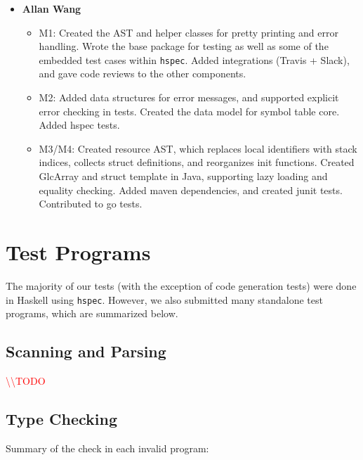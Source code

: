 \documentclass[11pt]{article}
\newcommand{\todo}[0]{\textcolor{red}{\textbackslash\textbackslash TODO \ }}
\begin{document}
\begin{itemize}
	\item \textbf{Allan Wang}
	\begin{itemize}
		\item M1: Created the AST and helper classes for
		pretty printing and error handling.  Wrote the base package for
		testing as well as some of the embedded test cases within
		\texttt{hspec}.  Added integrations (Travis + Slack), and gave code
		reviews to the other components.
		\item M2: Added data structures for error messages,
		and supported explicit error checking in tests. Created the data
		model for symbol table core. Added hspec tests.
		\item M3/M4: Created resource AST, which replaces local identifiers with stack indices, collects struct definitions, and reorganizes init functions. Created GlcArray and struct template in Java, supporting lazy loading and equality checking. Added maven dependencies, and created junit tests. Contributed to go tests.
	\end{itemize}
\end{itemize}

\newpage

 

\newpage
\appendix
\section{Test Programs}
\label{sec:appendixa}

The majority of our tests (with the exception of code generation tests) were done in
Haskell using \texttt{hspec}. However, we also submitted many standalone test programs,
which are summarized below.

\subsection*{Scanning and Parsing}

\todo%

\subsection*{Type Checking}

Summary of the check in each invalid program:
\end{document}
